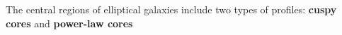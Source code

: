 \documentclass[letterpaper,landscape]{slides}
\begin{document}




\begin{slide}
\begin{center}
\vskip -0.1in
\end{center}


\vfill
\end{slide}





\begin{slide}
The central regions of elliptical galaxies include two types of profiles:
{\bf cuspy cores} and {\bf power-law cores} 


\begin{center}
\vskip -0.1in
\end{center}

\vfill
\end{slide}
\end{document}
